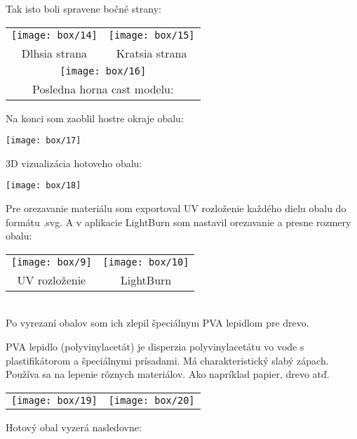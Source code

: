         Tak isto boli spravene bočné strany: \\

        \begin{tabular}{c c}
          \texttt{[image: box/14]} & \texttt{[image: box/15]} \\
          Dlhsia strana & Kratsia strana \\
          \multicolumn{2}{c}{\texttt{[image: box/16]}} \\
          \multicolumn{2}{c}{Posledna horna cast modelu:}
        \end{tabular}

        Na konci som zaoblil hostre okraje obalu:

        \begin{center}
          \texttt{[image: box/17]}
        \end{center}

        3D vizualizácia hotoveho obalu: \\

        \begin{center}
          \texttt{[image: box/18]}
        \end{center}

        Pre orezavanie materiálu som exportoval UV rozloženie každého dielu obalu do formátu .svg. A v aplikacie LightBurn som nastavil orezavanie a presne rozmery obalu:

        \begin{tabular}{c c}
          \texttt{[image: box/9]} & \texttt{[image: box/10]} \\
          UV rozloženie & LightBurn \\
        \end{tabular} \\

        Po vyrezaní obalov som ich zlepil špeciálnym PVA lepidlom pre drevo.

        PVA lepidlo (polyvinylacetát) je disperzia polyvinylacetátu vo vode s plastifikátorom a špeciálnymi prísadami. Má charakteristický slabý zápach. Používa sa na lepenie rôznych materiálov. Ako napríklad papier, drevo atď. \\

        \begin{tabular}{c c}
          \texttt{[image: box/19]} & \texttt{[image: box/20]} \\
        \end{tabular}
        Hotový obal vyzerá nasledovne:

